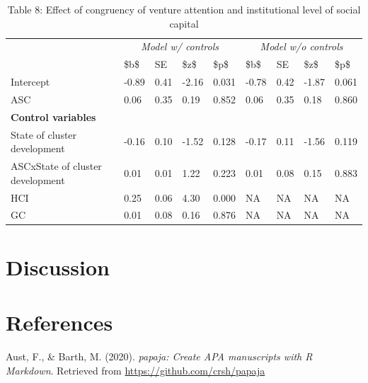 \documentclass[
  english,
  man]{apa6}
\begin{document}
\begin{table}

\caption{\label{tab:unnamed-chunk-18}Table 8: Effect of congruency of venture attention and institutional level of social capital}
\centering
\begin{tabular}[t]{l|l|l|l|l|l|l|l|l}
\hline
\multicolumn{1}{c|}{\em{ }} & \multicolumn{4}{c|}{\em{Model w/ controls}} & \multicolumn{4}{c}{\em{Model w/o controls}} \\
\cline{2-5} \cline{6-9}
  & \$b\$ & SE & \$z\$ & \$p\$ & \$b\$ & SE & \$z\$ & \$p\$\\
\hline
Intercept & -0.89 & 0.41 & -2.16 & 0.031 & -0.78 & 0.42 & -1.87 & 0.061\\
\hline
ASC & 0.06 & 0.35 & 0.19 & 0.852 & 0.06 & 0.35 & 0.18 & 0.860\\
\hline
\multicolumn{9}{l}{\textbf{Control variables}}\\
\hline
\hspace{1em}State of cluster development & -0.16 & 0.10 & -1.52 & 0.128 & -0.17 & 0.11 & -1.56 & 0.119\\
\hline
\hspace{1em}ASCxState of cluster development & 0.01 & 0.01 & 1.22 & 0.223 & 0.01 & 0.08 & 0.15 & 0.883\\
\hline
HCI & 0.25 & 0.06 & 4.30 & 0.000 & NA & NA & NA & NA\\
\hline
GC & 0.01 & 0.08 & 0.16 & 0.876 & NA & NA & NA & NA\\
\hline
\end{tabular}
\end{table}

\hypertarget{discussion}{%
\section{Discussion}\label{discussion}}

\newpage

\hypertarget{references}{%
\section{References}\label{references}}

\begingroup
\setlength{\parindent}{-0.5in}
\setlength{\leftskip}{0.5in}

\hypertarget{refs}{}
\leavevmode\hypertarget{ref-R-papaja}{}%
Aust, F., \& Barth, M. (2020). \emph{papaja: Create APA manuscripts with R Markdown}. Retrieved from \url{https://github.com/crsh/papaja}
\end{document}
